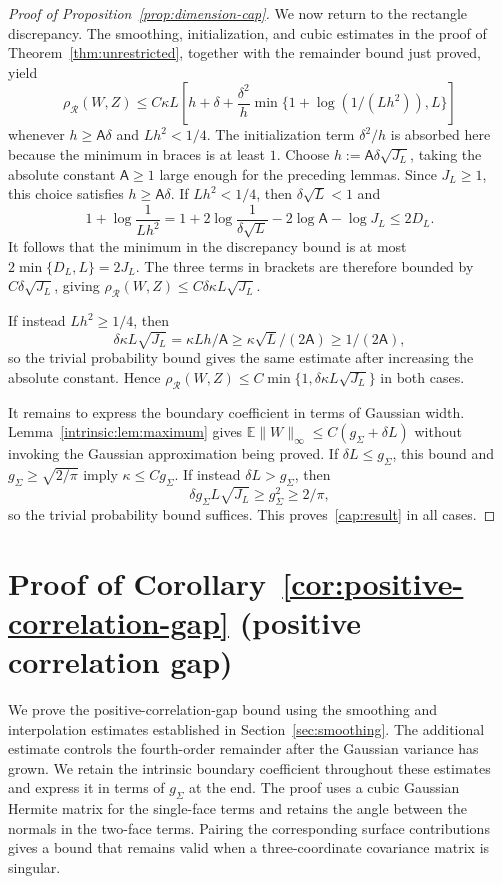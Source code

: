 \documentclass[11pt,letterpaper]{article}
\theoremstyle{remark}
\newcommand{\E}{\mathbb E}
\newcommand{\rh}{\rho_{\mathcal R}}
\begin{document}
\begin{proof}[Proof of Proposition~\ref{prop:dimension-cap}]
We now return to the rectangle discrepancy. The smoothing,
initialization, and cubic estimates in the proof of
Theorem~\ref{thm:unrestricted}, together with the remainder
bound just proved, yield
\[
 \rh(W,Z)\le C\kappa L\left[
 h+\delta+\frac{\delta^2}h
       \min\{1+\log(1/(Lh^2)),L\}\right]
\]
whenever $h\ge\mathsf A\delta$ and $Lh^2<1/4$.
The initialization term $\delta^2/h$ is absorbed here because
the minimum in braces is at least $1$.
Choose $h:=\mathsf A\delta\sqrt{J_L}$, taking the absolute
constant $\mathsf A\ge1$ large enough for the preceding lemmas.
Since $J_L\ge1$, this choice satisfies $h\ge\mathsf A\delta$.
If $Lh^2<1/4$, then $\delta\sqrt L<1$ and
\[
 1+\log\frac1{Lh^2}
 =1+2\log\frac1{\delta\sqrt L}
       -2\log\mathsf A-\log J_L
 \le2D_L.
\]
It follows that the minimum in the discrepancy bound is at
most $2\min\{D_L,L\}=2J_L$.
The three terms in brackets are therefore bounded by
$C\delta\sqrt{J_L}$, giving
$\rh(W,Z)\le C\delta\kappa L\sqrt{J_L}$.

If instead $Lh^2\ge1/4$, then
\[
 \delta\kappa L\sqrt{J_L}
 =\kappa Lh/\mathsf A
 \ge\kappa\sqrt L/(2\mathsf A)\ge1/(2\mathsf A),
\]
so the trivial probability bound gives the same estimate after
increasing the absolute constant. Hence
$\rh(W,Z)\le C\min\{1,\delta\kappa L\sqrt{J_L}\}$ in both cases.

It remains to express the boundary coefficient in terms of Gaussian
width. Lemma~\ref{intrinsic:lem:maximum} gives
$\E\|W\|_\infty\le C(g_\Sigma+\delta L)$ without invoking
the Gaussian approximation being proved. If $\delta L\le g_\Sigma$,
this bound and $g_\Sigma\ge\sqrt{2/\pi}$ imply
$\kappa\le Cg_\Sigma$. If instead $\delta L>g_\Sigma$, then
\[
 \delta g_\Sigma L\sqrt{J_L}\ge g_\Sigma^2\ge2/\pi,
\]
so the trivial probability bound suffices.
This proves~\eqref{cap:result} in all cases.
\end{proof}

\clearpage
\section{Proof of Corollary~\ref*{cor:positive-correlation-gap} (positive correlation gap)}
\label{app:correlation-gap-proof}

We prove the positive-correlation-gap bound using the smoothing and
interpolation estimates established in Section~\ref{sec:smoothing}.
The additional estimate controls the fourth-order remainder after the
Gaussian variance has grown. We retain the intrinsic boundary coefficient
throughout these estimates and express it in terms of $g_\Sigma$ at the end.
The proof uses a cubic Gaussian Hermite
matrix for the single-face terms and retains the angle between the
normals in the two-face terms. Pairing the corresponding surface
contributions gives a bound that remains valid when a three-coordinate
covariance matrix is singular.
\end{document}
